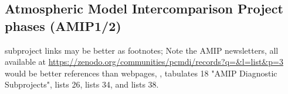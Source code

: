 \documentclass[gmd, preprint]{copernicus}
\newcommand{\mycomment}[1]{}
\def\cred#1{{\color{red}#1}}
\begin{document}
\mycomment{
1955-65: Establishment of Atmospheric General Circulation Modelling
http://pne.people.si.umich.edu/sloan/1955_65.html
Establishment of the IPCC UNEP 70th plenary meeting 6 December 1988
https://documents.un.org/doc/resolution/gen/nr0/530/32/img/nr053032.pdf?OpenElement
}

\subsection{Atmospheric Model Intercomparison Project phases (AMIP1/2)}
\label{sec:amip1And2}
\cred{subproject links may be better as footnotes; Note the AMIP newsletters, all available at \url{https://zenodo.org/communities/pcmdi/records?q=&l=list&p=3} would be better references than webpages, \citep[e.g.,][p. 6, Newsletter 4, Aug 1993]{gates_amip_1993}, tabulates 18 "AMIP Diagnostic Subprojects", \citep[e.g.,][p. 6, Newsletter 6, Feb 1995]{gates_amip_1995} lists 26, \citep[e.g.,][p. 8, Newsletter 9, Jul 1999]{gleckler_amip_1999} lists 34, and \citep[e.g.,][p. 7, Newsletter 10, Aug 2001]{gleckler_amip_2001} lists 38.}
\end{document}

